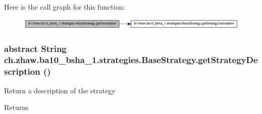 Here is the call graph for this function:\nopagebreak
\begin{figure}[H]
\begin{center}
\leavevmode
\includegraphics[width=345pt]{classch_1_1zhaw_1_1ba10__bsha__1_1_1strategies_1_1BaseStrategy_a56e779e4ce93ac1570b34bcde23e7455_cgraph}
\end{center}
\end{figure}
\hypertarget{classch_1_1zhaw_1_1ba10__bsha__1_1_1strategies_1_1BaseStrategy_a75fdb36932ad701f6375cc1fe718056b}{
\subsubsection[{getStrategyDescription}]{\setlength{\rightskip}{0pt plus 5cm}abstract String ch.zhaw.ba10\_\-bsha\_\-1.strategies.BaseStrategy.getStrategyDescription ()}}
\label{classch_1_1zhaw_1_1ba10__bsha__1_1_1strategies_1_1BaseStrategy_a75fdb36932ad701f6375cc1fe718056b}
Return a description of the strategy

\begin{DoxyReturn}{Returns}

\end{DoxyReturn}


